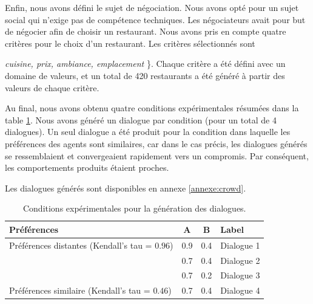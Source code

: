 				
				Enfin, nous avons défini le sujet de négociation. Nous avons opté pour un sujet social qui n'exige pas de compétence techniques. Les négociateurs avait pour but de négocier afin de choisir un restaurant. Nous avons pris en compte quatre critères pour le choix d'un restaurant. 	Les critères sélectionnés sont \ {\textit {cuisine, prix, ambiance, emplacement} \}. Chaque critère a été défini avec un domaine de valeurs, et un total de 420 restaurants a été généré à partir des valeurs de chaque critère.
				
				
				Au final, nous avons obtenu quatre conditions expérimentales résumées dans la table \ref{table:conditions}. Nous avons généré un dialogue par condition (pour un total de 4 dialogues). Un seul dialogue a été produit pour la condition dans laquelle les préférences des agents sont similaires, car dans le cas précis, les dialogues générés se ressemblaient et convergeaient rapidement vers un compromis. Par conséquent, les comportements produits étaient proches.   
				
				Les dialogues générés sont disponibles en annexe \ref{annexe:crowd}.
				
				\begin{table}[h]
					\centering
					\begin{tabular}{ |l|c|c|l| }
						\hline
						\textbf{Préférences}& \textbf{A} & \textbf{B} & \textbf{Label} \\ 
						\hline
						\newline\multirow{3}{*} {Préférences distantes (Kendall's tau = $0.96$)} & 0.9 & 0.4 & Dialogue 1 \\ \cline{2-4}
						
						\newline  & 0.7 & 0.4 & Dialogue 2\\ \cline{2-4}
						
						\newline   &0.7 & 0.2 & Dialogue 3\\ 
						\hline
						\newline Préférences similaire (Kendall's tau = $0.46$) & 0.7 & 0.4 & Dialogue 4\\
						\hline
					\end{tabular}
					\caption{Conditions expérimentales pour la génération des dialogues.} 
					\label{table:conditions}
				\end{table}
		
}
